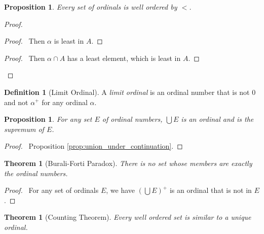 \documentclass{report}
\let\qed\relax
\newtheorem{prop}[ax]{Proposition}
\newtheorem{thm}[ax]{Theorem}
\theoremstyle{definition}
\newtheorem{df}[ax]{Definition}
\begin{document}
\begin{prop}
Every set of ordinals is well ordered by $<$.
\end{prop}

\begin{proof}
\pf
{}
\begin{proof}
	\pf\ Then $\alpha$ is least in $A$.
\end{proof}
\begin{proof}
	\pf\ Then $\alpha \cap A$ has a least element, which is least in $A$.
\end{proof}
\qed
\end{proof}

\begin{df}[Limit Ordinal]
A \emph{limit ordinal} is an ordinal number that is not 0 and not $\alpha^+$ for any ordinal $\alpha$.
\end{df}

\begin{prop}
For any set $E$ of ordinal numbers, $\bigcup E$ is an ordinal and is the supremum of $E$.
\end{prop}

\begin{proof}
\pf\ Proposition \ref{prop:union_under_continuation}. \qed
\end{proof}

\begin{thm}[Burali-Forti Paradox]
There is no set whose members are exactly the ordinal numbers.
\end{thm}

\begin{proof}
\pf\ For any set of ordinals $E$, we have $(\bigcup E)^+$ is an ordinal that is not in $E$. \qed
\end{proof}

\begin{thm}[Counting Theorem]
Every well ordered set is similar to a unique ordinal.
\end{thm}
\end{document}
